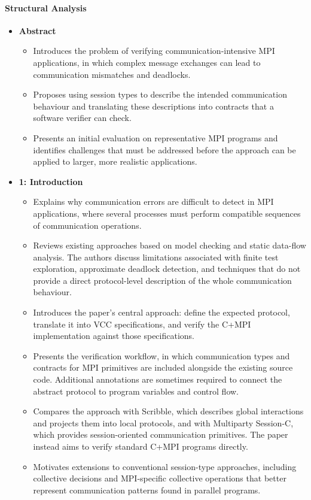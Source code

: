 \paragraph{Structural Analysis}
\begin{itemize}
    \item \textbf{Abstract}
    \begin{itemize}
        \item Introduces the problem of verifying communication-intensive MPI applications, in which complex message exchanges can lead to communication mismatches and deadlocks.
        \item Proposes using session types to describe the intended communication behaviour and translating these descriptions into contracts that a software verifier can check.
        \item Presents an initial evaluation on representative MPI programs and identifies challenges that must be addressed before the approach can be applied to larger, more realistic applications.
    \end{itemize}

    \item \textbf{1: Introduction}
    \begin{itemize}
        \item Explains why communication errors are difficult to detect in MPI applications, where several processes must perform compatible sequences of communication operations.
        \item Reviews existing approaches based on model checking and static data-flow analysis. The authors discuss limitations associated with finite test exploration, approximate deadlock detection, and techniques that do not provide a direct protocol-level description of the whole communication behaviour.
        \item Introduces the paper's central approach: define the expected protocol, translate it into VCC specifications, and verify the C+MPI implementation against those specifications.
        \item Presents the verification workflow, in which communication types and contracts for MPI primitives are included alongside the existing source code. Additional annotations are sometimes required to connect the abstract protocol to program variables and control flow.
        \item Compares the approach with Scribble, which describes global interactions and projects them into local protocols, and with Multiparty Session-C, which provides session-oriented communication primitives. The paper instead aims to verify standard C+MPI programs directly.
        \item Motivates extensions to conventional session-type approaches, including collective decisions and MPI-specific collective operations that better represent communication patterns found in parallel programs.
    \end{itemize}


\end{itemize}
